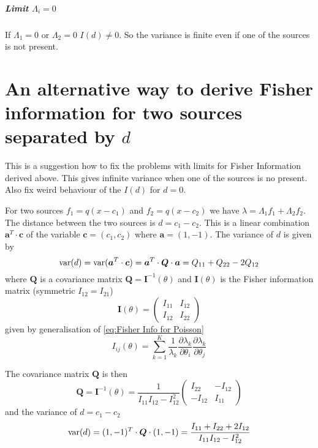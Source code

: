 \noindent
\subparagraph*{Limit $\Lambda_i=0$}

If $\Lambda_1=0$ or $\Lambda_2=0$ $I(d)\neq0$. So the variance is finite even if one of the sources is not present.


\section{An alternative way to derive Fisher information for two sources separated by $d$\label{sub:Appendix An-alternative-way-Fisher-info}}

This is a suggestion how to fix the problems with limits for Fisher Information derived above. This gives infinite variance when one of the sources is no present. Also fix weird behaviour of the $I(d)$ for $d=0$. 

For two sources $f_1=q(x-c_1)$ and $f_2=q(x-c_2)$ we have $\lambda=\Lambda_1f_1+\Lambda_2f_2$. The distance between the two sources is $d=c_1-c_2$. This is a linear combination $\bm{a}^T\cdot\bm{c}$ of the variable $\bm{c}=(c_1,c_2)$ where $\bm{a}=(1,-1)$. The variance of $d$ is given by
%
\begin{equation}
	\mathrm{var}(d)=\mathrm{var}(\bm{a}^T\cdot\bm{c})=\bm{a}^T\cdot\bm{Q}\cdot\bm{a}=Q_{11}+Q_{22}-2Q_{12}
	\label{eq:variance of linear combination}
\end{equation}
%
where $\bm{Q}$ is a covariance matrix $\bm{Q}=\bm{I}^{-1}(\theta)$ and $\bm{I}(\theta)$ is the Fisher information matrix (symmetric
$I_{12}=I_{21}$) 
%
\begin{equation}
	\bm{I}(\theta)=\left(
	\begin{array}{cc}
		I_{11} & I_{12}\\
		I_{12} & I_{22}
	\end{array}\right)
\end{equation}
%
given by generalisation of \autoref{eq:Fisher Info for Poisson}
%
\begin{equation}
	I_{ij}(\theta)=\sum_{k=1}^K\frac{1}{\lambda_k}\frac{\partial\lambda_k}{\partial\theta_i}\frac{\partial\lambda_k}{\partial\theta_j}
\end{equation}

The covariance matrix $\bm{Q}$ is then 
%
\begin{equation}
	\bm{Q}=\bm{I}^{-1}(\theta)=\frac{1}{I_{11}I_{12}-I_{12}^2}\left(
	\begin{array}{cc}	
		I_{22} & -I_{12}\\
		-I_{12} & I_{11}
	\end{array}\right)
\end{equation}
%
and the variance of $d=c_1-c_2$ 
%
\begin{equation}
	\mathrm{var}(d)=(1,-1)^T\cdot\bm{Q}\cdot(1,-1)=\frac{I_{11}+I_{22}+2I_{12}}{I_{11}I_{12}-I_{12}^2}
	\label{eq:variance alternative}
\end{equation}

